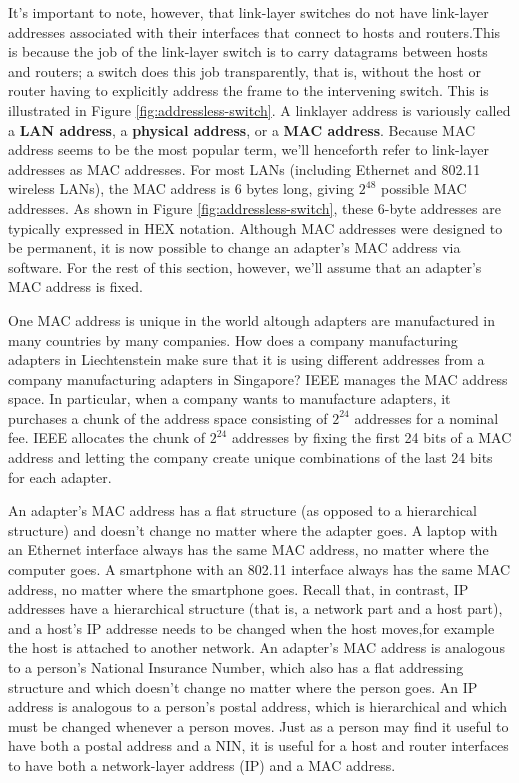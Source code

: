 \documentclass[a4paper,12pt]{book}
\begin{document}
\noindent It’s important to note, however, that link-layer switches do not have link-layer addresses associated with their interfaces that connect to hosts and routers.This is because the job of the link-layer switch is to carry datagrams between hosts and routers; a switch does this job transparently, that is, without the host or router having to explicitly address the frame to the intervening switch. This is illustrated in Figure \ref{fig:addressless-switch}. A linklayer address is variously called a \textbf{LAN address}, a \textbf{physical address}, or a \textbf{MAC address}. Because MAC address seems to be the most popular term, we’ll henceforth refer to link-layer addresses as MAC addresses. For most LANs (including Ethernet and 802.11 wireless LANs), the MAC address is 6 bytes long, giving $2^{48}$ possible MAC addresses. As shown in Figure \ref{fig:addressless-switch}, these 6-byte addresses are typically expressed in HEX notation. Although MAC addresses were designed to be permanent, it is now possible to change an adapter’s MAC address via software. For the rest of this section, however, we’ll assume that an adapter’s MAC address is fixed.

One MAC address is unique in the world altough adapters are manufactured in many countries by many companies. How does a company manufacturing adapters in Liechtenstein make sure that it is using different addresses from a company manufacturing adapters in Singapore? IEEE manages the MAC address space. In particular, when a company wants to manufacture adapters, it purchases a chunk of the address space consisting of $2^{24}$ addresses for a nominal fee. IEEE allocates the chunk of $2^{24}$ addresses by fixing the first 24 bits of a MAC address and letting the company create unique combinations of the last 24 bits for each adapter.

An adapter’s MAC address has a flat structure (as opposed to a hierarchical structure) and doesn’t change no matter where the adapter goes. A laptop with an Ethernet interface always has the same MAC address, no matter where the computer goes. A smartphone with an 802.11 interface always has the same MAC address, no matter where the smartphone goes. Recall that, in contrast, IP addresses have a hierarchical structure (that is, a network part and a host part), and a host’s IP addresse needs to be changed when the host moves,for example the host is attached to another network. An adapter’s MAC address is analogous to a person’s National Insurance Number, which also has a flat addressing structure and which doesn’t change no matter
where the person goes. An IP address is analogous to a person’s postal address, which is hierarchical and which must be changed whenever a person moves. Just as a person may find it useful to have both a postal address and a NIN, it is useful for a host and router interfaces to have both a network-layer address (IP) and
a MAC address.
\end{document}
